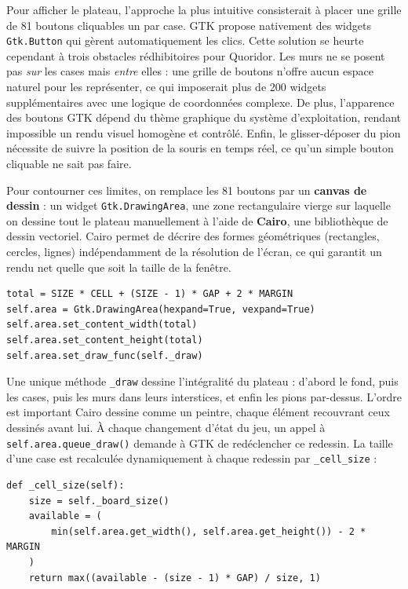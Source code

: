 \documentclass[a4paper]{article}
\begin{document}
Pour afficher le plateau, l'approche la plus intuitive consisterait à
placer une grille de 81 boutons cliquables un par case. GTK propose
nativement des widgets \texttt{Gtk.Button} qui gèrent automatiquement
les clics. Cette solution se heurte cependant à trois obstacles
rédhibitoires pour Quoridor. Les murs ne se posent pas \emph{sur} les
cases mais \emph{entre} elles : une grille de boutons n'offre aucun
espace naturel pour les représenter, ce qui imposerait plus de 200
widgets supplémentaires avec une logique de coordonnées complexe.
De plus, l'apparence des boutons GTK dépend du thème graphique du
système d'exploitation, rendant impossible un rendu visuel homogène
et contrôlé. Enfin, le glisser-déposer du pion nécessite de suivre
la position de la souris en temps réel, ce qu'un simple bouton
cliquable ne sait pas faire.

Pour contourner ces limites, on remplace les 81 boutons par un
\textbf{canvas de dessin} : un widget \texttt{Gtk.DrawingArea}, une
zone rectangulaire vierge sur laquelle on dessine tout le plateau
manuellement à l'aide de \textbf{Cairo}, une bibliothèque de dessin
vectoriel. Cairo permet de décrire des formes géométriques (rectangles,
cercles, lignes) indépendamment de la résolution de l'écran, ce qui
garantit un rendu net quelle que soit la taille de la fenêtre.

\begin{lstlisting}[caption={Création de la zone de dessin}]
total = SIZE * CELL + (SIZE - 1) * GAP + 2 * MARGIN
self.area = Gtk.DrawingArea(hexpand=True, vexpand=True)
self.area.set_content_width(total)
self.area.set_content_height(total)
self.area.set_draw_func(self._draw)
\end{lstlisting}

Une unique méthode \texttt{\_draw} dessine l'intégralité du plateau :
d'abord le fond, puis les cases, puis les murs dans leurs interstices,
et enfin les pions par-dessus. L'ordre est important Cairo dessine
comme un peintre, chaque élément recouvrant ceux dessinés avant lui.
À chaque changement d'état du jeu, un appel à
\texttt{self.area.queue\_draw()} demande à GTK de redéclencher ce
redessin. La taille d'une case est recalculée dynamiquement à chaque
redessin par \texttt{\_cell\_size} :

\begin{lstlisting}[caption={Calcul dynamique de la taille d'une case}]
def _cell_size(self):
    size = self._board_size()
    available = (
        min(self.area.get_width(), self.area.get_height()) - 2 * MARGIN
    )
    return max((available - (size - 1) * GAP) / size, 1)
\end{lstlisting}
\end{document}
